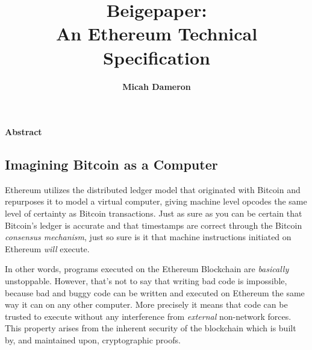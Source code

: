 \documentclass[10pt,a4paper,leqno,bibliography=totoc]{scrartcl}
\author{\large{\textbf{Micah Dameron}}}
\date{}
\title{\LARGE{Beigepaper: \\ An Ethereum Technical Specification}}
\makeatletter
\let\mcnewpage=\newpage
\newcommand{\TrickSupertabularIntoMulticols}{%
\renewcommand\newpage{%
	      \if@firstcolumn
	            \hrule width\linewidth height0pt
          \columnbreak
      \else
        \mcnewpage
       \fi
  }%
 }
\newenvironment{alphafootnotes}
{\par\edef\savedfootnotenumber{\number\value{footnote}}
\renewcommand{\thefootnote}{\alph{footnote}}
\setcounter{footnote}{0}}
{\par\setcounter{footnote}{\savedfootnotenumber}}
\makeatother
\begin{document}

	\begin{alphafootnotes}

	\pagecolor{beige}

	\maketitle

	\begin{center}\textbf{Abstract}\end{center}\par

	\begin{multicols*}{2}
	\TrickSupertabularIntoMulticols
	\begin{justify}
	
	
	\section{Imagining Bitcoin as a Computer}
		Ethereum utilizes the distributed ledger model that originated with Bitcoin and repurposes it to model a virtual computer, giving  machine level opcodes the same level of certainty as Bitcoin transactions. Just as sure as you can be certain that Bitcoin's ledger is accurate and that timestamps are correct through the Bitcoin \textit{consensus mechanism}, just so sure is it that machine instructions initiated on Ethereum \textit{will} execute.  	      
		
		
		In other words, programs executed on the Ethereum Blockchain are \textit{basically} unstoppable. However, that's not to say that writing bad code is impossible, because bad and buggy code can be written and executed on Ethereum the same way it can on any other computer. More precisely it means that code can be trusted to execute without any interference from \textit{external} non-network forces. This property arises from the inherent security of the blockchain which is built by, and maintained upon, cryptographic proofs.

\end{justify}
\end{multicols*}
\end{alphafootnotes}
\end{document}
